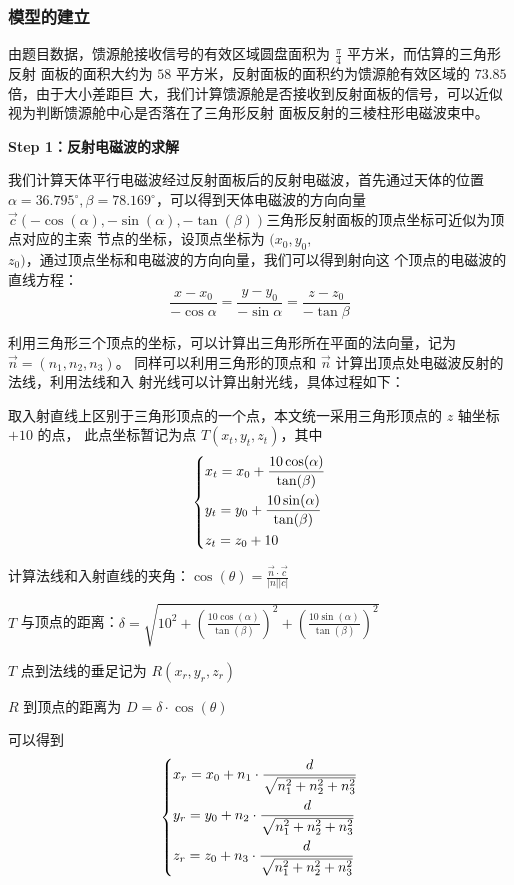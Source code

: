 \documentclass[withoutpreface,bwprint]{cumcmthesis} %
\begin{document}
\subsubsection{模型的建立}
由题目数据，馈源舱接收信号的有效区域圆盘面积为 $\frac{\pi}{4} $ 平方米，而估算的三角形反射
面板的面积大约为 $58$ 平方米，反射面板的面积约为馈源舱有效区域的 $73.85$ 倍，由于大小差距巨
大，我们计算馈源舱是否接收到反射面板的信号，可以近似视为判断馈源舱中心是否落在了三角形反射
面板反射的三棱柱形电磁波束中。

\textbf{Step 1：反射电磁波的求解}

我们计算天体平行电磁波经过反射面板后的反射电磁波，首先通过天体的位置 $\alpha = 36.795^\circ,
\beta = 78.169^\circ$，可以得到天体电磁波的方向向量 $\overrightarrow{c} 
(-\cos(\alpha),-\sin(\alpha),-\tan(\beta))$三角形反射面板的顶点坐标可近似为顶点对应的主索
节点的坐标，设顶点坐标为 $(x_0,y_0,$\\$z_0)$，通过顶点坐标和电磁波的方向向量，我们可以得到射向这
个顶点的电磁波的直线方程：
\[
    \frac{x-x_0}{-\cos\alpha} = \frac{y-y_0}{-\sin\alpha} = \frac{z-z_0}{-\tan\beta} 
\]

利用三角形三个顶点的坐标，可以计算出三角形所在平面的法向量，记为 $\overrightarrow{n}=(n_1,n_2,n_3)$。
同样可以利用三角形的顶点和 $\overrightarrow{n} $ 计算出顶点处电磁波反射的法线，利用法线和入
射光线可以计算出射光线，具体过程如下：

取入射直线上区别于三角形顶点的一个点，本文统一采用三角形顶点的 $z$ 轴坐标 $+10$ 的点，
此点坐标暂记为点 $T(x_t,y_t,z_t)$，其中
\[
    \begin{dcases}
        x_t=x_0+\frac{10\cos(\alpha)}{\tan(\beta)} \\
        y_t=y_0+\frac{10\sin(\alpha)}{\tan(\beta)} \\
        z_t=z_0+10
    \end{dcases}
\]

计算法线和入射直线的夹角：$\cos(\theta)=\frac{\displaystyle\overrightarrow{n}\cdot\overrightarrow{c}}
{\displaystyle|n||c|}$

\smallskip
$T$ 与顶点的距离：$\delta=\displaystyle\sqrt{10^2+(\frac{\displaystyle10\cos(\alpha)}
{\displaystyle\tan(\beta)})^2+(\frac{\displaystyle10\sin(\alpha)}{\displaystyle\tan(\beta)})^2}$

$T$ 点到法线的垂足记为 $R(x_r,y_r,z_r)$

$R$ 到顶点的距离为 $D=\delta\cdot \cos(\theta)$

可以得到
\[
    \begin{dcases}
        x_r=x_0+n_1 \cdot\frac{d}{\sqrt{n_1^2+n_2^2+n_3^2}}  \\
        y_r=y_0+n_2 \cdot\frac{d}{\sqrt{n_1^2+n_2^2+n_3^2}}  \\
        z_r=z_0+n_3 \cdot\frac{d}{\sqrt{n_1^2+n_2^2+n_3^2}}  \\
    \end{dcases}
\]
\end{document}
